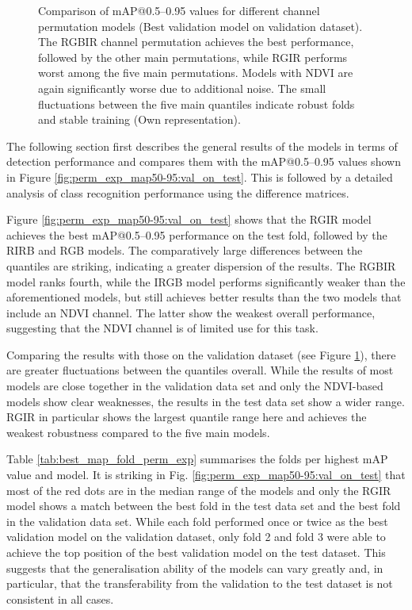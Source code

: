 \begin{figure}[b]
    \centering
    
    \caption[Comparison of \acrshort{mAP}@0.5--0.95 values for different channel permutation models (Best validation model on validation dataset)]{Comparison of \acrshort{mAP}@0.5--0.95 values for different channel permutation models (Best validation model on validation dataset). The RGBIR channel permutation achieves the best performance, followed by the other main permutations, while RGIR performs worst among the five main permutations. Models with NDVI are again significantly worse due to additional noise. The small fluctuations between the five main quantiles indicate robust folds and stable training (Own representation).}
    \label{fig:perm_exp_map50-95:val_on_val}
\end{figure}
The following section first describes the general results of the models in terms of detection performance and compares them with the \acrshort{mAP}@0.5--0.95 values shown in Figure \ref{fig:perm_exp_map50-95:val_on_test}. This is followed by a detailed analysis of class recognition performance using the difference matrices.  

Figure \ref{fig:perm_exp_map50-95:val_on_test} shows that the RGIR model achieves the best \acrshort{mAP}@0.5--0.95 performance on the test fold, followed by the RIRB and RGB models. The comparatively large differences between the quantiles are striking, indicating a greater dispersion of the results. The RGBIR model ranks fourth, while the IRGB model performs significantly weaker than the aforementioned models, but still achieves better results than the two models that include an NDVI channel. The latter show the weakest overall performance, suggesting that the NDVI channel is of limited use for this task.  

Comparing the results with those on the validation dataset (see Figure \ref{fig:perm_exp_map50-95:val_on_val}), there are greater fluctuations between the quantiles overall. While the results of most models are close together in the validation data set and only the NDVI-based models show clear weaknesses, the results in the test data set show a wider range. RGIR in particular shows the largest quantile range here and achieves the weakest robustness compared to the five main models.
 
Table \ref{tab:best_map_fold_perm_exp} summarises the folds per highest \acrshort{mAP} value and model. It is striking in Fig. \ref{fig:perm_exp_map50-95:val_on_test} that most of the red dots are in the median range of the models and only the \acrshort{RGIR} model shows a match between the best fold in the test data set and the best fold in the validation data set.  While each fold performed once or twice as the best validation model on the validation dataset, only fold 2 and fold 3 were able to achieve the top position of the best validation model on the test dataset. This suggests that the generalisation ability of the models can vary greatly and, in particular, that the transferability from the validation to the test dataset is not consistent in all cases.  

